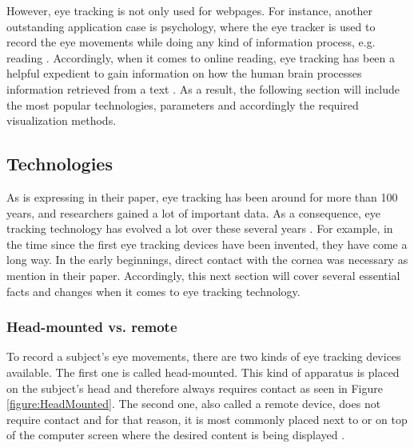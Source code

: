 However, eye tracking is not only used for webpages. For instance, another outstanding application case is psychology, where the eye tracker is used to record the eye movements while doing any kind of information process, e.g. reading \autocite{schiessl2003eye}.
Accordingly, when it comes to online reading, eye tracking has been a helpful expedient to gain information on how the human brain processes information retrieved from a text \autocite[]{schiessl2003eye}.
As a result, the following section will include the most popular technologies, parameters and accordingly the required visualization methods. 

\subsection{Technologies}
\label{subsection:Technologies}
As \textcite[]{biedert2010eyebook} is expressing in their paper, eye tracking has been around for more than 100 years, and researchers gained a lot of important data. As a consequence, eye tracking technology has evolved a lot over these several years \autocite[]{poole2006eye}.
For example, in the time since the first eye tracking devices have been invented, they have come a long way. In the early beginnings, direct contact with the cornea was necessary as \textcite[]{jacob2003eye} mention in their paper.
Accordingly, this next section will cover several essential facts and changes when it comes to eye tracking technology.

\subsubsection{Head-mounted vs. remote}
To record a subject's eye movements, there are two kinds of eye tracking devices available. The first one is called head-mounted. This kind of apparatus is placed on the subject's head and therefore always requires contact as seen in Figure \ref{figure:HeadMounted}. 
The second one, also called a remote device, does not require contact and for that reason, it is most commonly placed next to or on top of the computer screen where the desired content is being displayed \autocite[]{jacob2003eye, schiessl2003eye}.

